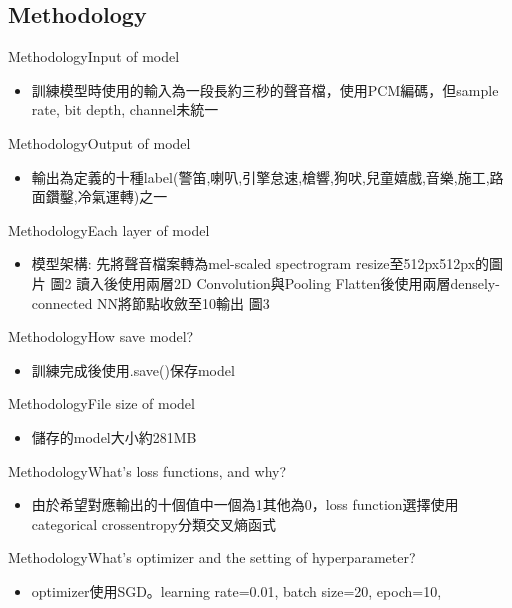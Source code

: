 \documentclass{beamer}
\begin{document}
\begin{CJK}{UTF8}{bsmi}
\section{Methodology}
\begin{frame}{Methodology}{Input of model }
  \begin{itemize}
  \item {
   訓練模型時使用的輸入為一段長約三秒的聲音檔，使用PCM編碼，但sample rate, bit depth, channel未統一
  }
  \end{itemize}
\end{frame}
\begin{frame}{Methodology}{Output of model }
  \begin{itemize}
  \item {
   輸出為定義的十種label(警笛,喇叭,引擎怠速,槍響,狗吠,兒童嬉戲,音樂,施工,路面鑽鑿,冷氣運轉)之一
  }
  \end{itemize}
\end{frame}
\begin{frame}{Methodology}{Each layer of model }
  \begin{itemize}
  \item {
    模型架構: 先將聲音檔案轉為mel-scaled spectrogram resize至512px512px的圖片  圖2 讀入後使用兩層2D Convolution與Pooling Flatten後使用兩層densely-connected NN將節點收斂至10輸出  圖3
  }
  \end{itemize}
\end{frame}
\begin{frame}{Methodology}{How save model? }
  \begin{itemize}
  \item {
    訓練完成後使用.save()保存model
  }
  \end{itemize}
\end{frame}
\begin{frame}{Methodology}{File size of model }
  \begin{itemize}
  \item {
    儲存的model大小約281MB
  }
  \end{itemize}
\end{frame}
\begin{frame}{Methodology}{What’s loss functions, and why? }
  \begin{itemize}
  \item {
   由於希望對應輸出的十個值中一個為1其他為0，loss function選擇使用categorical crossentropy分類交叉熵函式 
  }
  \end{itemize}
\end{frame}
\begin{frame}{Methodology}{What’s optimizer and the setting of hyperparameter? }
  \begin{itemize}
  \item {
    optimizer使用SGD。learning rate=0.01, batch size=20, epoch=10,
  }
  \end{itemize}
\end{frame}

\end{CJK}
\end{document}
